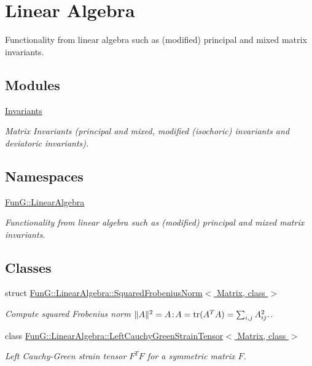 \hypertarget{group__LinearAlgebraGroup}{}\section{Linear Algebra}
\label{group__LinearAlgebraGroup}


Functionality from linear algebra such as (modified) principal and mixed matrix invariants.  


\subsection*{Modules}
\begin{DoxyCompactItemize}
\item 
\hyperlink{group__InvariantGroup}{Invariants}
\begin{DoxyCompactList}\small\item\em Matrix Invariants (principal and mixed, modified (isochoric) invariants and deviatoric invariants). \end{DoxyCompactList}\end{DoxyCompactItemize}
\subsection*{Namespaces}
\begin{DoxyCompactItemize}
\item 
 \hyperlink{namespaceFunG_1_1LinearAlgebra}{Fun\+G\+::\+Linear\+Algebra}
\begin{DoxyCompactList}\small\item\em Functionality from linear algebra such as (modified) principal and mixed matrix invariants. \end{DoxyCompactList}\end{DoxyCompactItemize}
\subsection*{Classes}
\begin{DoxyCompactItemize}
\item 
struct \hyperlink{structFunG_1_1LinearAlgebra_1_1SquaredFrobeniusNorm}{Fun\+G\+::\+Linear\+Algebra\+::\+Squared\+Frobenius\+Norm$<$ Matrix, class $>$}
\begin{DoxyCompactList}\small\item\em Compute squared Frobenius norm $ \|A\|^2 = A\negthinspace : \negthinspace A = \mathrm{tr}(A^TA) = \sum_{i,j} A_{ij}^2. $. \end{DoxyCompactList}\item 
class \hyperlink{classFunG_1_1LinearAlgebra_1_1LeftCauchyGreenStrainTensor}{Fun\+G\+::\+Linear\+Algebra\+::\+Left\+Cauchy\+Green\+Strain\+Tensor$<$ Matrix, class $>$}
\begin{DoxyCompactList}\small\item\em Left Cauchy-\/\+Green strain tensor $ F^T F $ for a symmetric matrix $ F $. \end{DoxyCompactList}\end{DoxyCompactItemize}

